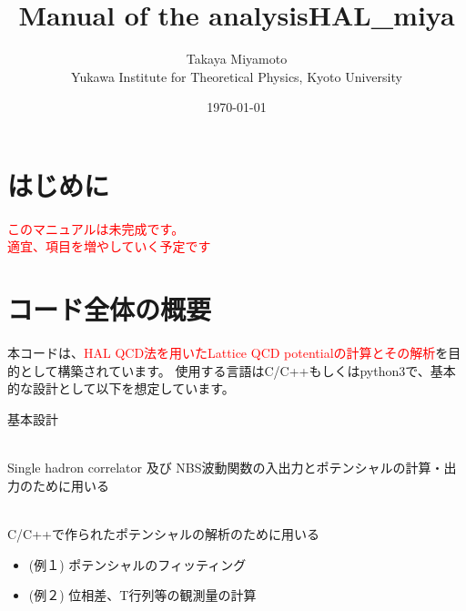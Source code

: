 \documentclass[12pt, a4paper]{jsarticle}
\title{Manual of the analysisHAL\_miya}
\author{
Takaya Miyamoto \\
{\small Yukawa Institute for Theoretical Physics, Kyoto University}
}
\date{\today}
\begin{document}
\maketitle
\tableofcontents
\newpage
\section*{はじめに}
{\huge \textcolor{red}{このマニュアルは未完成です。\\適宜、項目を増やしていく予定です}\\}
\section{コード全体の概要}
本コードは、\textcolor{red}{HAL QCD法を用いたLattice QCD potentialの計算とその解析}を目的として構築されています。
使用する言語はC/C++もしくはpython3で、基本的な設計として以下を想定しています。\\
\begin{itembox}[l]{基本設計}
	\begin{description}
		\setlength{\itemsep}{0.3cm}
		\item[C/C++] \mbox{} \\
		Single hadron correlator 及び NBS波動関数の入出力とポテンシャルの計算・出力のために用いる
		\setlength{\itemsep}{0.3cm}
		\item[python3] \mbox{} \\
		C/C++で作られたポテンシャルの解析のために用いる
		\begin{itemize}
			\item{(例１)} ポテンシャルのフィッティング
			\item{(例２)} 位相差、T行列等の観測量の計算
		\end{itemize}
	\end{description}
\end{itembox} \\
\end{document}
